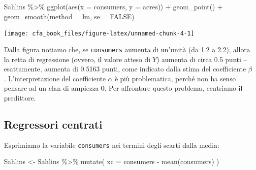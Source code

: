 \documentclass[
  11pt,
]{krantz}
\makeatletter
\newenvironment{Shaded}{\begin{snugshade}}{\end{snugshade}}
\newcommand{\AttributeTok}[1]{\textcolor[rgb]{0.61,0.61,0.61}{#1}}
\newcommand{\CommentTok}[1]{\textcolor[rgb]{0.37,0.37,0.37}{\textit{#1}}}
\newcommand{\ConstantTok}[1]{\textcolor[rgb]{0,0,0}{#1}}
\newcommand{\FunctionTok}[1]{\textcolor[rgb]{0,0,0}{#1}}
\newcommand{\NormalTok}[1]{#1}
\newcommand{\OtherTok}[1]{\textcolor[rgb]{0.37,0.37,0.37}{#1}}
\newcommand{\SpecialCharTok}[1]{\textcolor[rgb]{0,0,0}{#1}}
\newenvironment{kframe}{%
\medskip{}
\setlength{\fboxsep}{.8em}
 \def\at@end@of@kframe{}%
 \ifinner\ifhmode%
  \def\at@end@of@kframe{\end{minipage}}%
  \begin{minipage}{\columnwidth}%
 \fi\fi%
 \def\FrameCommand##1{\hskip\@totalleftmargin \hskip-\fboxsep
 \colorbox{shadecolor}{##1}\hskip-\fboxsep
     \hskip-\linewidth \hskip-\@totalleftmargin \hskip\columnwidth}%
 \MakeFramed {\advance\hsize-\width
   \@totalleftmargin\z@ \linewidth\hsize
   \@setminipage}}%
 {\par\unskip\endMakeFramed%
 \at@end@of@kframe}
\renewenvironment{Shaded}{\begin{kframe}}{\end{kframe}}
\theoremstyle{definition}
\theoremstyle{definition}
\theoremstyle{definition}
\theoremstyle{definition}
\theoremstyle{remark}
\makeatother
\begin{document}
\begin{Shaded}
\begin{Highlighting}[]
\NormalTok{Sahlins }\SpecialCharTok{\%\textgreater{}\%}
  \FunctionTok{ggplot}\NormalTok{(}\FunctionTok{aes}\NormalTok{(}\AttributeTok{x =}\NormalTok{ consumers, }\AttributeTok{y =}\NormalTok{ acres)) }\SpecialCharTok{+}
  \FunctionTok{geom\_point}\NormalTok{() }\SpecialCharTok{+}
  \FunctionTok{geom\_smooth}\NormalTok{(}\AttributeTok{method =}\NormalTok{ lm, }\AttributeTok{se =} \ConstantTok{FALSE}\NormalTok{)}
\end{Highlighting}
\end{Shaded}

\begin{center}\texttt{[image: cfa\_book\_files/figure-latex/unnamed-chunk-4-1]} \end{center}

\begin{Shaded}
\end{Shaded}

Dalla figura notiamo che, se \texttt{consumers} aumenta di un'unità (da 1.2 a 2.2), allora la retta di regressione (ovvero, il valore atteso di \(Y\)) aumenta di circa 0.5 punti -- esattamente, aumenta di 0.5163 punti, come indicato dalla stima del coefficiente \(\beta\). L'interpretazione del coefficiente \(\alpha\) è più problematica, perché non ha senso pensare ad un clan di ampiezza 0. Per affrontare questo problema, centriamo il predittore.

\hypertarget{regressori-centrati}{%
\subsection{Regressori centrati}\label{regressori-centrati}}

Esprimiamo la variabile \texttt{consumers} nei termini degli scarti dalla media:

\begin{Shaded}
\begin{Highlighting}[]
\NormalTok{Sahlins }\OtherTok{\textless{}{-}}\NormalTok{ Sahlins }\SpecialCharTok{\%\textgreater{}\%}
  \FunctionTok{mutate}\NormalTok{(}
    \AttributeTok{xc =}\NormalTok{ consumers }\SpecialCharTok{{-}} \FunctionTok{mean}\NormalTok{(consumers)}
\NormalTok{  )}
\end{Highlighting}
\end{Shaded}
\end{document}
